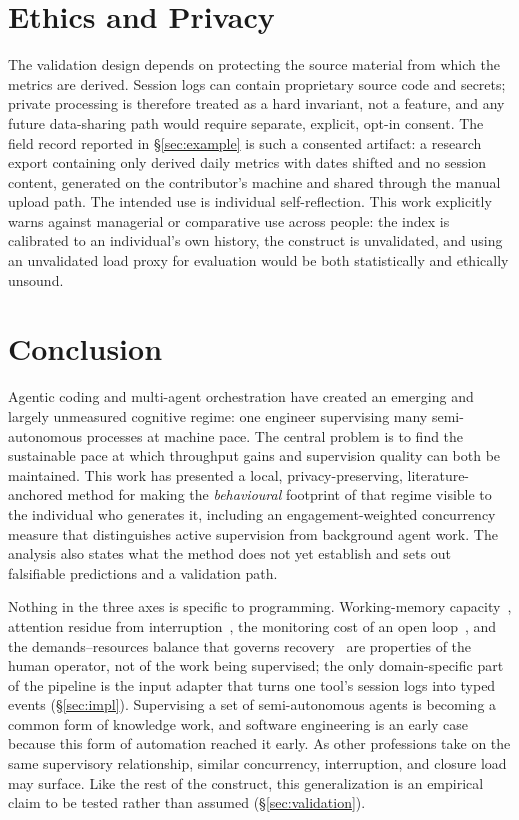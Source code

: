 \documentclass[10pt,twocolumn]{article}
\begin{document}
\section{Ethics and Privacy}
The validation design depends on protecting the source material from which the
metrics are derived. Session logs can contain proprietary source code and
secrets; private processing is therefore treated as a hard invariant, not a
feature, and any future
data-sharing path would require separate, explicit, opt-in consent. The field
record reported in \S\ref{sec:example} is such a consented artifact: a
research export containing only derived daily metrics with dates shifted and
no session content, generated on the contributor's machine and shared through
the manual upload path. The intended
use is individual self-reflection. This work explicitly warns against managerial or
comparative use across people: the index is calibrated to an individual's own
history, the construct is unvalidated, and using an unvalidated load proxy for
evaluation would be both statistically and ethically unsound.

\section{Conclusion}
Agentic coding and multi-agent orchestration have created an emerging and largely
unmeasured cognitive regime: one engineer supervising many semi-autonomous
processes at machine pace. The central problem is to find the sustainable pace at
which throughput gains and supervision quality can both be maintained. This work
has presented a local, privacy-preserving, literature-anchored method for making the
\emph{behavioural} footprint of that regime visible to the individual who
generates it, including an engagement-weighted concurrency measure that
distinguishes active supervision from background agent work. The analysis also
states what the method does not yet establish and sets out falsifiable
predictions and a validation path.

Nothing in the three axes is specific to programming. Working-memory
capacity~\cite{cowan2001}, attention residue from
interruption~\cite{leroy2009,mark2008}, the monitoring cost of an open
loop~\cite{smith2003,masicampo2011}, and the demands--resources balance that
governs recovery~\cite{demerouti2001,mcewen1998} are properties of the human
operator, not of the work being supervised; the only domain-specific part of the
pipeline is the input adapter that turns one tool's session logs into typed
events (\S\ref{sec:impl}). Supervising a set of semi-autonomous agents is
becoming a common form of knowledge work, and software engineering is an early
case because this form of automation reached it early. As other
professions take on the same supervisory relationship, similar concurrency,
interruption, and closure load may surface. Like the rest of the construct,
this generalization is an empirical claim to be tested rather than assumed
(\S\ref{sec:validation}).
\end{document}
